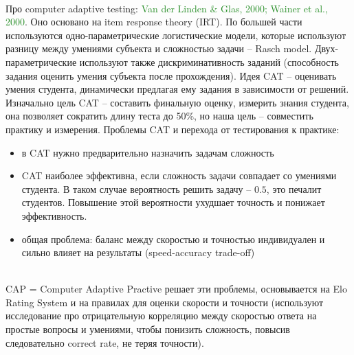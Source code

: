 \documentclass[12pt]{article}
\begin{document}
    \\\indent Про computer adaptive testing: \textcolor{ForestGreen}{Van der Linden & Glas, 2000; Wainer et al., 2000}. Оно основано на item response theory (IRT). По большей части используются одно-параметрические логистические модели, которые используют разницу между умениями субъекта и сложностью задачи -- Rasch model. Двух-параметрические используют также дискриминативность заданий (способность задания оценить умения субъекта после прохождения). Идея CAT -- оценивать умения студента, динамически предлагая ему задания в зависимости от решений. Изначально цель CAT -- составить финальную оценку, измерить знания студента, она позволяет сократить длину теста до 50\%, но наша цель -- совместить практику и измерения. Проблемы CAT и перехода от тестирования к практике:
         \begin{itemize}
            \item в CAT нужно предварительно назначить задачам сложность
            \item CAT наиболее эффективна, если сложность задачи совпадает со умениями студента. В таком случае вероятность решить задачу -- $0.5$, это печалит студентов. Повышение этой вероятности ухудшает точность и понижает эффективность.
            \item общая проблема: баланс между скоростью и точностью индивидуален и сильно влияет на результаты (speed-accuracy trade-off)
        \end{itemize}
    \\\indent CAP = Computer Adaptive Practive решает эти проблемы, основывается на Elo Rating System\cite{elo1978rating} и на правилах для оценки скорости и точности (используют исследование про отрицательную корреляцию между скоростью ответа на простые вопросы и умениями, чтобы понизить сложность, повысив следовательно correct rate, не теряя точности).
\end{document}
